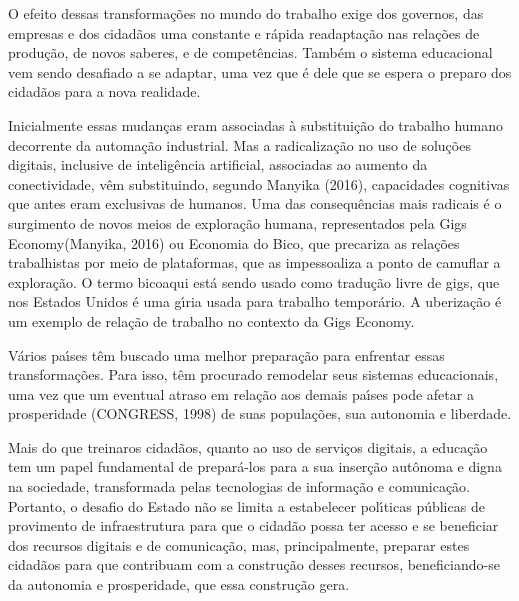 \documentclass[
12pt,		%
openright,	%
twoside,  %
a4paper,			%
chapter=TITLE,		%
english,			%
french,				%
spanish,			%
brazil				%
]{USPSC-classe/USPSC}
\begin{document}
O efeito dessas transforma\c{c}\~oes no mundo do trabalho exige dos governos, das empresas e dos cidad\~aos uma constante e r\'apida readapta\c{c}\~ao  nas rela\c{c}\~oes de produ\c{c}\~ao, de novos saberes, e de  compet\^encias. Tamb\'em o sistema educacional vem sendo desafiado a se adaptar, uma vez que \'e dele que se espera o preparo dos cidad\~aos para a nova realidade.








Inicialmente essas mudan\c{c}as eram associadas \`a substitui\c{c}\~ao do trabalho humano decorrente da automa\c{c}\~ao industrial. Mas a radicaliza\c{c}\~ao no uso de solu\c{c}\~oes digitais, inclusive de intelig\^encia artificial, associadas ao aumento da conectividade, v\^em substituindo, segundo  Manyika (2016), \textquotedbl capacidades cognitivas que antes eram exclusivas de humanos\textquotedbl . Uma das consequ\^encias mais radicais \'e o surgimento de novos meios de explora\c{c}\~ao humana, representados pela \textquotedbl Gigs Economy\textquotedbl   (Manyika, 2016) ou \textquotedbl Economia do Bico\textquotedbl , que precariza as rela\c{c}\~oes trabalhistas por meio de plataformas, que as impessoaliza a ponto de camuflar a explora\c{c}\~ao. O termo \textquotedbl bico\textquotedbl  aqui est\'a sendo usado como tradu\c{c}\~ao livre de \textquotedbl gigs\textquotedbl , que nos Estados Unidos \'e uma g\'{\i}ria usada para trabalho tempor\'ario. A uberiza\c{c}\~ao \'e um exemplo de rela\c{c}\~ao de trabalho no contexto da Gigs Economy.








V\'arios pa\'{\i}ses t\^em buscado uma melhor prepara\c{c}\~ao para enfrentar essas transforma\c{c}\~oes. Para isso, t\^em procurado remodelar seus sistemas educacionais, uma vez que um eventual atraso em rela\c{c}\~ao aos demais pa\'{\i}ses pode afetar a prosperidade (CONGRESS, 1998)  de suas popula\c{c}\~oes, sua autonomia e liberdade.








Mais do que \textquotedbl treinar\textquotedbl  os cidad\~aos, quanto ao uso  de servi\c{c}os digitais, a educa\c{c}\~ao tem um papel fundamental de prepar\'a-los para a sua inser\c{c}\~ao aut\^onoma e digna na sociedade, transformada pelas tecnologias de informa\c{c}\~ao e comunica\c{c}\~ao. Portanto, o desafio do Estado n\~ao se limita a estabelecer pol\'{\i}ticas p\'ublicas de provimento de infraestrutura para que o cidad\~ao possa ter acesso e se beneficiar dos recursos digitais e de comunica\c{c}\~ao, mas, principalmente, preparar estes cidad\~aos para que contribuam com a  constru\c{c}\~ao desses recursos, beneficiando-se da autonomia e prosperidade, que  essa constru\c{c}\~ao gera.
\end{document}
